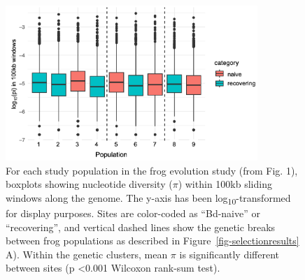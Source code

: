 \documentclass[9pt,twoside,lineno]{pnas-new}
\begin{document}
\newpage

\begin{figure}

{\centering \includegraphics[width=0.85\textwidth]{figures/boxplot_genomewide_pi_by_pop.png}

}

\caption{\label{fig-boxplot-genomewide-pi-by-pop}For each study
population in the frog evolution study (from
Fig. 1), boxplots showing nucleotide
diversity (\(\pi\)) within 100kb sliding windows along the genome. The
y-axis has been log\textsubscript{10}-transformed for display purposes.
Sites are color-coded as ``Bd-naive'' or ``recovering'', and vertical
dashed lines show the genetic breaks between frog populations as
described in Figure~\ref{fig-selectionresults} A). Within the genetic
clusters, mean \(\pi\) is significantly different between sites (p
\textless0.001 Wilcoxon rank-sum test).}

\end{figure}\clearpage

\newpage
\end{document}
